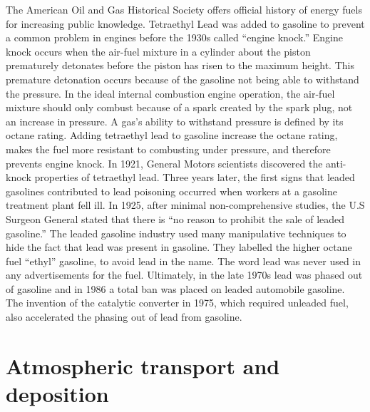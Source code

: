 \documentclass{article}\usepackage[]{graphicx}\usepackage[]{color}
\begin{document}
The American Oil and Gas Historical Society offers official history of energy fuels for increasing public knowledge. Tetraethyl Lead was added to gasoline to prevent a common problem in engines before the 1930s called “engine knock.” Engine knock occurs when the air-fuel mixture in a cylinder about the piston prematurely detonates before the piston has risen to the maximum height. This premature detonation occurs because of the gasoline not being able to withstand the pressure. In the ideal internal combustion engine operation, the air-fuel mixture should only combust because of a spark created by the spark plug, not an increase in pressure. A gas’s ability to withstand pressure is defined by its octane rating. Adding tetraethyl lead to gasoline increase the octane rating, makes the fuel more resistant to combusting under pressure, and therefore prevents engine knock. In 1921, General Motors scientists discovered the anti-knock properties of tetraethyl lead. Three years later, the first signs that leaded gasolines contributed to lead poisoning occurred when workers at a gasoline treatment plant fell ill. In 1925, after minimal non-comprehensive studies, the U.S Surgeon General stated that there is “no reason to prohibit the sale of leaded gasoline.” The leaded gasoline industry used many manipulative techniques to hide the fact that lead was present in gasoline. They labelled the higher octane fuel “ethyl” gasoline, to avoid lead in the name. The word lead was never used in any advertisements for the fuel. Ultimately, in the late 1970s lead was phased out of gasoline and in 1986 a total ban was placed on leaded automobile gasoline. The invention of the catalytic converter in 1975, which required unleaded fuel, also accelerated the phasing out of lead from gasoline. 

\bigskip



\section{Atmospheric transport and deposition}
\end{document}
